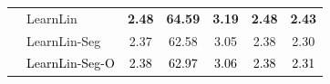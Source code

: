 \begin{table}[!t]
\begin{tabular}{@{}cl||ccccc@{}}
        & LearnLin     & \textbf{2.48} & \textbf{64.59} & \textbf{3.19} & \textbf{2.48} & \textbf{2.43}  \\
        & LearnLin-Seg & 2.37 & 62.58 & 3.05 & 2.38 & 2.30  \\
        & \textcolor{black}{LearnLin-Seg-O} & \textcolor{black}{2.38} & \textcolor{black}{62.97} & \textcolor{black}{3.06} & \textcolor{black}{2.38} & \textcolor{black}{2.31}  \\
        \hline
        \toprule[1.25pt]
    \end{tabular}
    \vspace{-2.0em}
\end{table}